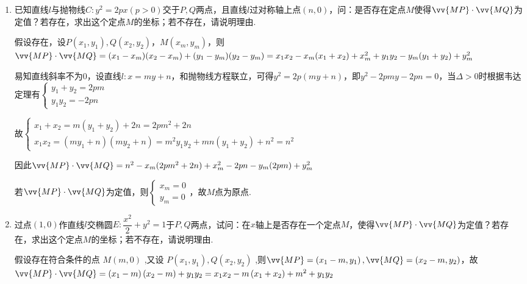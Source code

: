 \begin{enumerate}
    \item 已知直线$l$与抛物线$C: y^2 = 2px (p > 0)$交于$P,Q$两点，且直线$l$过对称轴上点$(n,0)$，问：是否存在定点$M$使得$\vv{MP} \cdot \vv{MQ}$为定值？若存在，求出这个定点$M$的坐标；若不存在，请说明理由.
    \begin{jieda}
        假设存在，设$P(x_1, y_1), Q(x_2, y_2)$，$M(x_m, y_m)$，则$\vv{MP} \cdot \vv{MQ} = (x_1-x_m)(x_2-x_m) + (y_1-y_m)(y_2-y_m) = x_1x_2 - x_m (x_1+x_2) + x_m^2 + y_1y_2 - y_m (y_1+y_2) + y_m^2$

        易知直线斜率不为0，设直线$l: x = my+n$，和抛物线方程联立，可得$y^2 = 2p(my+n)$，即$y^2 - 2pmy - 2pn = 0$，当$\Delta > 0$时根据韦达定理有$\left\{\begin{array}{l}
             y_1+y_2 = 2pm \\
             y_1y_2 = -2pn
        \end{array}\right.$

        故$\left\{\begin{array}{l}
             x_1+x_2 = m(y_1+y_2)+2n = 2pm^2+2n \\
             x_1x_2 = (my_1+n)(my_2+n) = m^2y_1y_2 + mn(y_1+y_2) + n^2 = n^2
        \end{array}\right.$

        因此$\vv{MP} \cdot \vv{MQ} = n^2 - x_m (2pm^2+2n) + x_m^2 - 2pn - y_m (2pm) + y_m^2$

        若$\vv{MP} \cdot \vv{MQ}$为定值，则$\left\{\begin{array}{l}
             x_m = 0 \\
             y_m = 0
        \end{array}\right.$，故$M$点为原点.
    \end{jieda}

    \begin{vspace_}
    \vsp[4]
    \end{vspace_}
    
    \item 过点$(1, 0)$作直线$l$交椭圆$E: \dfrac{x^2}{2} + y^2 = 1$于$P,Q$两点，试问：在$x$轴上是否存在一个定点$M$，使得$\vv{MP} \cdot \vv{MQ}$为定值？若存在，求出这个定点$M$的坐标；若不存在，请说明理由.
    \clearpage
    \begin{jieda}
        假设存在符合条件的点 $M\left( {m,0}\right)$ ,又设 $P\left( {{x}_{1},{y}_{1}}\right) ,Q\left( {{x}_{2},{y}_{2}}\right)$ ,则$\vv{MP} = \left( {{x}_{1} - m,{y}_{1}}\right) ,\vv{MQ} = \left( {{x}_{2} - m,{y}_{2}}\right)$，故$\vv{MP} \cdot  \vv{MQ} = \left( {{x}_{1} - m}\right) \left( {{x}_{2} - m}\right)  + {y}_{1}{y}_{2} = {x}_{1}{x}_{2} - m\left( {{x}_{1} + {x}_{2}}\right)  + {m}^{2} + {y}_{1}{y}_{2}$
        

\end{jieda}
\end{enumerate}

